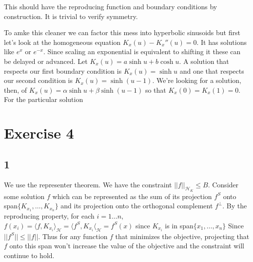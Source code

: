 \documentclass[12pt]{article}
\begin{document}
This should have the reproducing function and boundary conditions by construction. It is trivial to verify symmetry.

To amke this cleaner we can factor this mess into hyperbolic sinusoids but first let's look at the homogeneous equation $K_x(u) - K_x''(u) = 0$. It has solutions like $e^x$ or $e^{-x}$. Since scaling an exponential is equivalent to shifting it these can be delayed or advanced. Let $K_x(u) = a \sinh u + b \cosh u$. A solution that respects our first boundary condition is $K_x(u) = \sinh u$ and one that respects our second condition is $K_x(u) = \sinh (u-1)$. We're looking for a solution, then, of $K_x(u) = \alpha \sinh u + \beta \sinh (u-1)$ so that $K_x(0) = K_x(1) = 0$. For the particular solution




\section{Exercise 4}
\subsection{1}
We use the representer theorem. We have the constraint $||f||_{\mathcal{H}_K} \leq B$. Consider some solution $f$ which can be represented as the sum of its projection $f^S$ onto span$\{K_{x_1},\ldots, K_{x_n}\}$ and its projection onto the orthogonal complement $f^\bot$. By the reproducing property, for each $i=1\ldots n$, $f(x_i) = \langle f, K_{x_i} \rangle_\mathcal{H} = \langle f^S, K_{x_i} \langle_\mathcal{H} = f^S(x)$ since $K_{x_i}$ is in span$\{x_1, \ldots, x_n\}$ Since $||f^S|| \leq ||f||$. Thus for any function $f$ that minimizes the objective, projecting that $f$ onto this span won't increase the value of the objective and the constraint will continue to hold.
\end{document}

